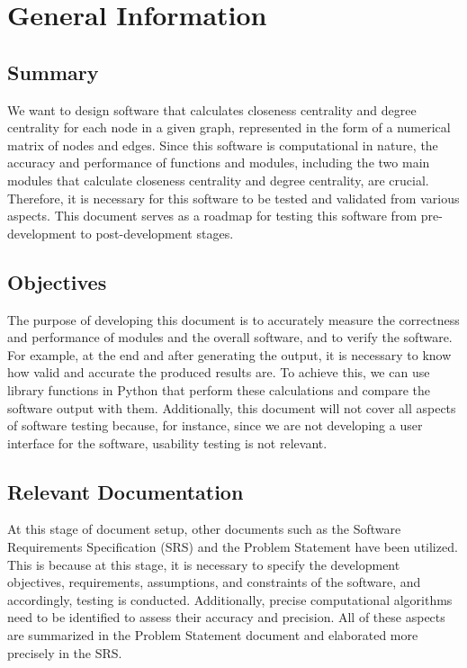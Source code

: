 \documentclass[12pt, titlepage]{article}
\begin{document}
\section{General Information}

\subsection{Summary}

We want to design software that calculates closeness centrality and degree centrality for each node in a given graph, represented in the form of a numerical matrix of nodes and edges. Since this software is computational in nature, the accuracy and performance of functions and modules, including the two main modules that calculate closeness centrality and degree centrality, are crucial. Therefore, it is necessary for this software to be tested and validated from various aspects. This document serves as a roadmap for testing this software from pre-development to post-development stages.
\subsection{Objectives}

The purpose of developing this document is to accurately measure the correctness and performance of modules and the overall software, and to verify the software. For example, at the end and after generating the output, it is necessary to know how valid and accurate the produced results are. To achieve this, we can use library functions in Python that perform these calculations and compare the software output with them. Additionally, this document will not cover all aspects of software testing because, for instance, since we are not developing a user interface for the software, usability testing is not relevant.

\subsection{Relevant Documentation}

At this stage of document setup, other documents such as the Software Requirements Specification (SRS) and the Problem Statement have been utilized. This is because at this stage, it is necessary to specify the development objectives, requirements, assumptions, and constraints of the software, and accordingly, testing is conducted. Additionally, precise computational algorithms need to be identified to assess their accuracy and precision. All of these aspects are summarized in the Problem Statement document and elaborated more precisely in the SRS.
\end{document}
